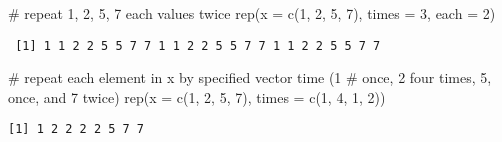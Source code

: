 \documentclass[
  letterpaper,
  DIV=11,
  numbers=noendperiod]{scrreprt}
\newenvironment{Shaded}{\begin{snugshade}}{\end{snugshade}}
\newcommand{\AttributeTok}[1]{\textcolor[rgb]{0.40,0.45,0.13}{#1}}
\newcommand{\CommentTok}[1]{\textcolor[rgb]{0.37,0.37,0.37}{#1}}
\newcommand{\DecValTok}[1]{\textcolor[rgb]{0.68,0.00,0.00}{#1}}
\newcommand{\FunctionTok}[1]{\textcolor[rgb]{0.28,0.35,0.67}{#1}}
\newcommand{\NormalTok}[1]{\textcolor[rgb]{0.00,0.23,0.31}{#1}}
\begin{document}
\begin{Shaded}
\begin{Highlighting}[]
\CommentTok{\# repeat 1, 2, 5, 7 each values twice}
\FunctionTok{rep}\NormalTok{(}\AttributeTok{x =} \FunctionTok{c}\NormalTok{(}\DecValTok{1}\NormalTok{, }\DecValTok{2}\NormalTok{, }\DecValTok{5}\NormalTok{, }\DecValTok{7}\NormalTok{), }\AttributeTok{times =} \DecValTok{3}\NormalTok{, }\AttributeTok{each =} \DecValTok{2}\NormalTok{)}
\end{Highlighting}
\end{Shaded}

\begin{verbatim}
 [1] 1 1 2 2 5 5 7 7 1 1 2 2 5 5 7 7 1 1 2 2 5 5 7 7
\end{verbatim}

\begin{Shaded}
\begin{Highlighting}[]
\CommentTok{\# repeat each element in x by specified vector time (1}
\CommentTok{\# once, 2 four times, 5, once, and 7 twice)}
\FunctionTok{rep}\NormalTok{(}\AttributeTok{x =} \FunctionTok{c}\NormalTok{(}\DecValTok{1}\NormalTok{, }\DecValTok{2}\NormalTok{, }\DecValTok{5}\NormalTok{, }\DecValTok{7}\NormalTok{), }\AttributeTok{times =} \FunctionTok{c}\NormalTok{(}\DecValTok{1}\NormalTok{, }\DecValTok{4}\NormalTok{, }\DecValTok{1}\NormalTok{, }\DecValTok{2}\NormalTok{))}
\end{Highlighting}
\end{Shaded}

\begin{verbatim}
[1] 1 2 2 2 2 5 7 7
\end{verbatim}
\end{document}
